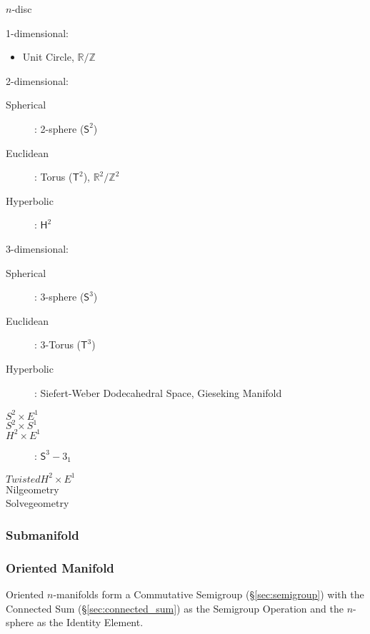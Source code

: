 $n$-disc

1-dimensional:

\begin{itemize}
  \item Unit Circle, $\mathbb{R}/\mathbb{Z}$
\end{itemize}

2-dimensional:

\begin{description}
  \item [Spherical]: 2-sphere ($\mathsf{S}^2$)
  \item [Euclidean]: Torus ($\mathsf{T}^2$),
  $\mathbb{R}^2/\mathbb{Z}^2$
  \item [Hyperbolic]: $\mathsf{H}^2$
\end{description}

3-dimensional:

\begin{description}
  \item [Spherical]: 3-sphere ($\mathsf{S}^3$)
  \item [Euclidean]: 3-Torus ($\mathsf{T}^3$)
  \item [Hyperbolic]: Siefert-Weber Dodecahedral Space, Gieseking
  Manifold
  \item [$S^2 \times E^1$]
  \item [$S^2 \times S^1$]
  \item [$H^2 \times E^1$]: $\mathsf{S}^3 - 3_1$
  \item [$Twisted H^2 \times E^1$]
  \item [Nilgeometry]
  \item [Solvegeometry]
\end{description}



\subsubsection{Submanifold}\label{sec:submanifold}

\subsubsection{Oriented Manifold}\label{sec:oriented_manifold}

Oriented $n$-manifolds form a Commutative Semigroup
(\S\ref{sec:semigroup}) with the Connected Sum
(\S\ref{sec:connected_sum}) as the Semigroup Operation and the
$n$-sphere as the Identity Element.



